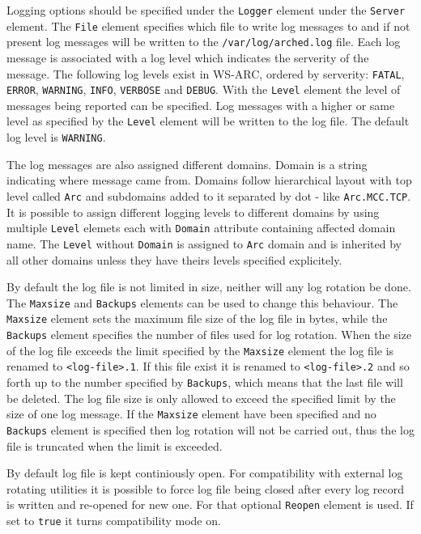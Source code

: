 \documentclass{article}
\begin{document}
Logging options should be specified under the \texttt{Logger} element under the
\texttt{Server} element. The \texttt{File} element specifies which file to write
log messages to and if not present log messages will be written to the
\texttt{/var/log/arched.log} file. Each log message is associated with a log
level which indicates the serverity of the message. The following log levels
exist in WS-ARC, ordered by serverity: \texttt{FATAL}, \texttt{ERROR},
\texttt{WARNING}, \texttt{INFO}, \texttt{VERBOSE} and \texttt{DEBUG}. With
the \texttt{Level} element the level of messages being reported can be
specified. Log messages with a higher or same level as specified by the
\texttt{Level} element will be written to the log file. The default log level is
\texttt{WARNING}.

The log messages are also assigned different domains. Domain is a string
indicating where message came from. Domains follow hierarchical layout with
top level called \texttt{Arc} and subdomains added to it separated by dot -
like \texttt{Arc.MCC.TCP}. It is possible to assign different logging levels
to different domains by using multiple \texttt{Level} elemets each with
\texttt{Domain} attribute containing affected domain name. The \texttt{Level}
without \texttt{Domain} is assigned to \texttt{Arc} domain and is inherited
by all other domains unless they have theirs levels specified explicitely.

By default the log file is not limited in size, neither
will any log rotation be done. The \texttt{Maxsize} and \texttt{Backups}
elements can be used to change this behaviour. The \texttt{Maxsize} element sets
the maximum file size of the log file in bytes, while the \texttt{Backups}
element specifies the number of files used for log rotation. When the size of
the log file exceeds the limit specified by the \texttt{Maxsize} element the log
file is renamed to \texttt{<log-file>.1}. If this file exist it is renamed to
\texttt{<log-file>.2} and so forth up to the number specified by
\texttt{Backups}, which means that the last file will be deleted. The log file
size is only allowed to exceed the specified limit by the size of one log
message. If the \texttt{Maxsize} element have been specified and no
\texttt{Backups} element is specified then log rotation will not be carried out,
thus the log file is truncated when the limit is exceeded.

By default log file is kept continiously open. For compatibility with external
log rotating utilities it is possible to force log file being closed after
every log record is written and re-opened for new one. For that optional
\texttt{Reopen} element is used. If set to \texttt{true} it turns compatibility
mode on.
\end{document}
